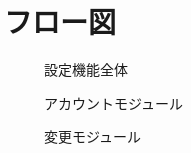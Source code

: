 \documentclass[a4j]{jarticle}
\begin{document}
\section{フロー図}

\begin{figure}[H]
\begin{center}
\caption{設定機能全体}
\label{allgrow}
\end{center}
\end{figure}

\begin{figure}[H]
\begin{center}
\caption{アカウントモジュール}
\label{deletemoju}
\end{center}
\end{figure}

\begin{figure}[H]
\begin{center}
\caption{変更モジュール}
\label{alubammoju}
\end{center}
\end{figure}
\end{document}
